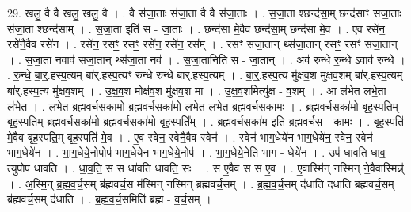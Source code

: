 \documentclass[17pt]{extarticle}
\begin{document}
29. खलु॒ वै वै खलु॒ खलु॒ वै । . वै स॑जा॒ताः स॑जा॒ता वै वै स॑जा॒ताः । . स॒जा॒ता श्छन्द॑सा॒म् छन्द॑साꣳ सजा॒ताः स॑जा॒ता श्छन्द॑साम् । . स॒जा॒ता इति॑ स - जा॒ताः । . छन्द॑सा मे॒वैव छन्द॑सा॒म् छन्द॑सा मे॒व । . ए॒व रसे॑न॒ रसे॑नै॒वैव रसे॑न । . रसे॑न॒ रसꣳ॒॒ रसꣳ॒॒ रसे॑न॒ रसे॑न॒ रस᳚म् । . रसꣳ॑ सजा॒तान् थ्स॑जा॒तान् रसꣳ॒॒ रसꣳ॑ सजा॒तान् । . स॒जा॒ता नवाव॑ सजा॒तान् थ्स॑जा॒ता नव॑ । . स॒जा॒तानिति॑ स - जा॒तान् । . अव॑ रुन्धे रु॒न्धे ऽवाव॑ रुन्धे । . रु॒न्धे॒ बा॒र्॒.ह॒स्प॒त्यम् बा॑र्.हस्प॒त्यꣳ रु॑न्धे रुन्धे बार्.हस्प॒त्यम् । . बा॒र्॒.ह॒स्प॒त्य मु॑क्षव॒श मु॑क्षव॒शम् बा॑र्.हस्प॒त्यम् बा॑र्.हस्प॒त्य मु॑क्षव॒शम् । . उ॒क्ष॒व॒श मोक्ष॑व॒श मु॑क्षव॒श मा । . उ॒क्ष॒व॒शमित्यु॑क्ष - व॒शम् । . आ ल॑भेत लभे॒ता ल॑भेत । . ल॒भे॒त॒ ब्र॒ह्म॒व॒र्च॒सका॑मो ब्रह्मवर्च॒सका॑मो लभेत लभेत ब्रह्मवर्च॒सका॑मः । . ब्र॒ह्म॒व॒र्च॒सका॑मो॒ बृह॒स्पति॒म् बृह॒स्पति॑म् ब्रह्मवर्च॒सका॑मो ब्रह्मवर्च॒सका॑मो॒ बृह॒स्पति᳚म् । . ब्र॒ह्म॒व॒र्च॒सका॑म॒ इति॑ ब्रह्मवर्च॒स - का॒मः॒ । . बृह॒स्पति॑ मे॒वैव बृह॒स्पति॒म् बृह॒स्पति॑ मे॒व । . ए॒व स्वेन॒ स्वेनै॒वैव स्वेन॑ । . स्वेन॑ भाग॒धेये॑न भाग॒धेये॑न॒ स्वेन॒ स्वेन॑ भाग॒धेये॑न । . भा॒ग॒धेये॒नोपोप॑ भाग॒धेये॑न भाग॒धेये॒नोप॑ । . भा॒ग॒धेये॒नेति॑ भाग - धेये॑न । . उप॑ धावति धाव॒ त्युपोप॑ धावति । . धा॒व॒ति॒ स स धा॑वति धावति॒ सः । . स ए॒वैव स स ए॒व । . ए॒वास्मि॑न् नस्मिन् ने॒वैवास्मिन्न्॑ । . अ॒स्मि॒न् ब्र॒ह्म॒व॒र्च॒सम् ब्र॑ह्मवर्च॒स म॑स्मिन् नस्मिन् ब्रह्मवर्च॒सम् । . ब्र॒ह्म॒व॒र्च॒सम् द॑धाति दधाति ब्रह्मवर्च॒सम् ब्र॑ह्मवर्च॒सम् द॑धाति । . ब्र॒ह्म॒व॒र्च॒समिति॑ ब्रह्म - व॒र्च॒सम् । \newline
\end{document}
